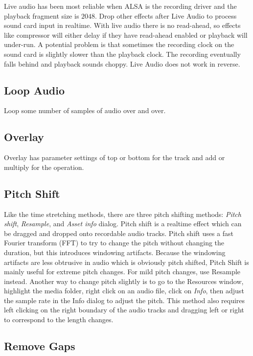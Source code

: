 Live audio has been most reliable when ALSA is the recording driver and the playback fragment size is $2048$. Drop other effects after Live Audio to process sound card input in realtime. With live audio there is no read-ahead, so effects like compressor will either delay if they have read-ahead enabled or playback will under-run. A potential problem is that sometimes the recording clock on the sound card is slightly slower than the playback clock. The recording eventually falls behind and playback sounds choppy. Live Audio does not work in reverse.

\subsection{Loop Audio}%
\label{sub:loop_audio}

Loop some number of samples of audio over and over.

\subsection{Overlay}%
\label{sub:overlay}

Overlay has parameter settings of top or bottom for the track and add or multiply for the operation.

\subsection{Pitch Shift}%
\label{sub:pitch_shift}

Like the time stretching methods, there are three pitch shifting methods: \textit{Pitch shift}, \textit{Resample}, and \textit{Asset info} dialog. Pitch shift is a realtime effect which can be dragged and dropped onto recordable audio tracks. Pitch shift uses a fast Fourier transform (FFT) to try to change the pitch without changing the duration, but this introduces windowing artifacts. Because the windowing artifacts are less obtrusive in audio which is obviously pitch shifted, Pitch Shift is mainly useful for extreme pitch changes. For mild pitch changes, use Resample instead. Another way to change pitch slightly is to go to the Resources window, highlight the media folder, right click on an audio file, click on \textit{Info}, then adjust the sample rate in the Info dialog to adjust the pitch. This method also requires left clicking on the right boundary of the audio tracks and dragging left or right to correspond to the length changes.

\subsection{Remove Gaps}%
\label{sub:remove_gaps}

